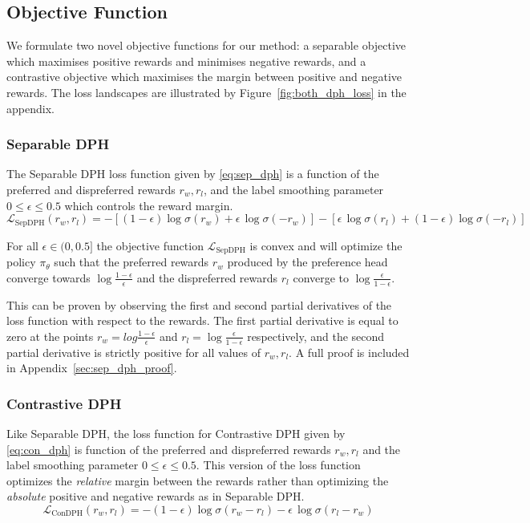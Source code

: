 \subsection{Objective Function}
We formulate two novel objective functions for our method: a separable objective which maximises positive rewards and minimises negative rewards, and a contrastive objective which maximises the margin between positive and negative rewards. The loss landscapes are illustrated by Figure~\ref{fig:both_dph_loss} in the appendix.

\subsubsection{Separable DPH}
The Separable DPH loss function given by \eqref{eq:sep_dph} is a function of the preferred and dispreferred rewards $r_w,r_l$, and the label smoothing parameter $0 \leq \epsilon \leq 0.5$ which controls the reward margin.
\begin{equation} \label{eq:sep_dph}
    \mathcal{L}_\text{SepDPH}(r_w,r_l)=
    - \left[ (1-\epsilon) \log \sigma(r_w) + \epsilon\, \log \sigma(-r_w) \right]
    - \left[ \epsilon\, \log \sigma(r_l) + (1-\epsilon) \log \sigma(-r_l) \right]
\end{equation}

\begin{theorem} \label{thrm:sep_dph_convergence}
For all $\epsilon \in (0,0.5]$ the objective function $\mathcal{L}_\text{SepDPH}$ is convex and will optimize the policy $\pi_\theta$ such that the preferred rewards $r_w$ produced by the preference head converge towards $\log\tfrac{1-\epsilon}{\epsilon}$ and the dispreferred rewards $r_l$ converge to $\log\tfrac{\epsilon}{1-\epsilon}$. %
\end{theorem}

This can be proven by observing the first and second partial derivatives of the loss function with respect to the rewards. The first partial derivative is equal to zero at the points $r_w=log\tfrac{1-\epsilon}{\epsilon}$ and $r_l=\log\tfrac{\epsilon}{1-\epsilon}$ respectively, and the second partial derivative is strictly positive for all values of $r_w,r_l$. A full proof is included in Appendix~\ref{sec:sep_dph_proof}.

\subsubsection{Contrastive DPH}
Like Separable DPH, the loss function for Contrastive DPH given by \eqref{eq:con_dph} is function of the preferred and dispreferred rewards $r_w,r_l$ and the label smoothing parameter $0 \leq \epsilon \leq 0.5$. This version of the loss function optimizes the \textit{relative} margin between the rewards rather than optimizing the \textit{absolute} positive and negative rewards as in Separable DPH.
\begin{equation}
    \mathcal{L}_\text{ConDPH}(r_w,r_l)=
    - (1-\epsilon) \log\sigma(r_w-r_l)
    -  \epsilon\, \log\sigma(r_l-r_w)
    \label{eq:con_dph}
\end{equation}

